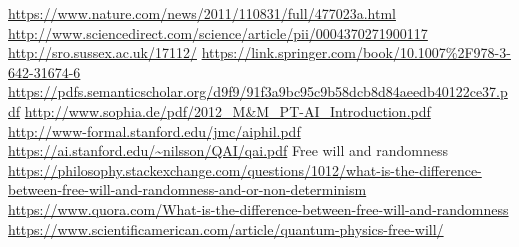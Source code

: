 \documentclass[a4,left=1cm]{article}
\begin{document}
\begin{thebibliography}{20}
 \url{https://www.nature.com/news/2011/110831/full/477023a.html}
 \url{http://www.sciencedirect.com/science/article/pii/0004370271900117}
 \url{http://sro.sussex.ac.uk/17112/}
 \url{https://link.springer.com/book/10.1007\%2F978-3-642-31674-6}
 \url{https://pdfs.semanticscholar.org/d9f9/91f3a9bc95c9b58dcb8d84aeedb40122ce37.pdf}
 \url{http://www.sophia.de/pdf/2012_M&M_PT-AI_Introduction.pdf}
 \url{http://www-formal.stanford.edu/jmc/aiphil.pdf}
 \url{https://ai.stanford.edu/~nilsson/QAI/qai.pdf}
 Free will and randomness \url{https://philosophy.stackexchange.com/questions/1012/what-is-the-difference-between-free-will-and-randomness-and-or-non-determinism} \url{https://www.quora.com/What-is-the-difference-between-free-will-and-randomness} \url{https://www.scientificamerican.com/article/quantum-physics-free-will/}
\end{thebibliography}
\end{document}
